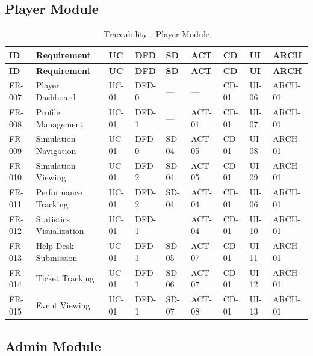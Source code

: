 \documentclass[12pt,a4paper]{article}
\begin{document}
\subsection{Player Module}

\begin{longtable}{|p{1cm}|p{3cm}|p{0.7cm}|p{0.8cm}|p{0.7cm}|p{0.7cm}|p{0.7cm}|p{0.7cm}|p{0.9cm}|}
\caption{Traceability - Player Module} \\
\hline
\textbf{ID} & \textbf{Requirement} & \textbf{UC} & \textbf{DFD} & \textbf{SD} & \textbf{ACT} & \textbf{CD} & \textbf{UI} & \textbf{ARCH} \\
\hline
\endfirsthead
\hline
\textbf{ID} & \textbf{Requirement} & \textbf{UC} & \textbf{DFD} & \textbf{SD} & \textbf{ACT} & \textbf{CD} & \textbf{UI} & \textbf{ARCH} \\
\hline
\endhead
FR-007 & Player Dashboard & UC-01 & DFD-0 & — & — & CD-01 & UI-06 & ARCH-01 \\
\hline
FR-008 & Profile Management & UC-01 & DFD-1 & — & ACT-01 & CD-01 & UI-07 & ARCH-01 \\
\hline
FR-009 & Simulation Navigation & UC-01 & DFD-0 & SD-04 & ACT-05 & CD-01 & UI-08 & ARCH-01 \\
\hline
FR-010 & Simulation Viewing & UC-01 & DFD-2 & SD-04 & ACT-05 & CD-01 & UI-09 & ARCH-01 \\
\hline
FR-011 & Performance Tracking & UC-01 & DFD-2 & SD-04 & ACT-04 & CD-01 & UI-06 & ARCH-01 \\
\hline
FR-012 & Statistics Visualization & UC-01 & DFD-1 & — & ACT-04 & CD-01 & UI-10 & ARCH-01 \\
\hline
FR-013 & Help Desk Submission & UC-01 & DFD-1 & SD-05 & ACT-07 & CD-01 & UI-11 & ARCH-01 \\
\hline
FR-014 & Ticket Tracking & UC-01 & DFD-1 & SD-06 & ACT-07 & CD-01 & UI-12 & ARCH-01 \\
\hline
FR-015 & Event Viewing & UC-01 & DFD-1 & SD-07 & ACT-08 & CD-01 & UI-13 & ARCH-01 \\
\hline
\end{longtable}

\subsection{Admin Module}
\end{document}
